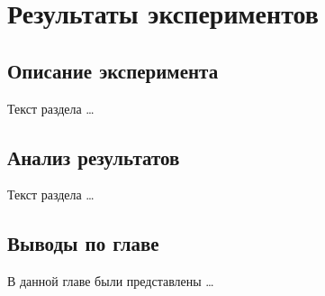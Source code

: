 \chapter{Результаты экспериментов}
\label{ch:chapter3}

\section{Описание эксперимента}
\label{sec:ch3:setup}

Текст раздела \ldots

\section{Анализ результатов}
\label{sec:ch3:results}

Текст раздела \ldots



\section{Выводы по главе}
\label{sec:ch3:summary}

В данной главе были представлены \ldots

